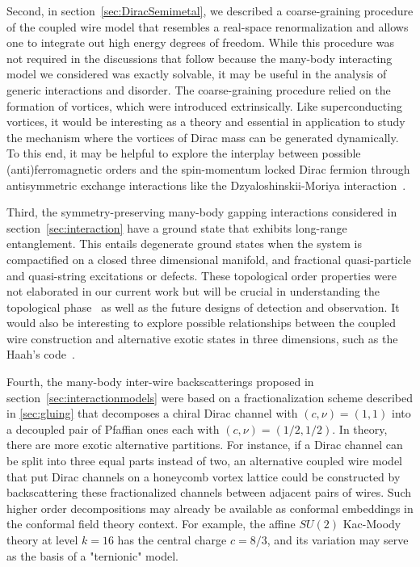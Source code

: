 Second, in section~\ref{sec:DiracSemimetal}, we described a coarse-graining procedure of the coupled wire model that resembles a real-space renormalization and allows one to integrate out high energy degrees of freedom. While this procedure was not required in the discussions that follow because the many-body interacting model we considered was exactly solvable, it may be useful in the analysis of generic interactions and disorder. The coarse-graining procedure relied on the formation of vortices, which were introduced extrinsically. Like superconducting vortices, it would be interesting as a theory and essential in application to study the mechanism where the vortices of Dirac mass can be generated dynamically. To this end, it may be helpful to explore the interplay between possible (anti)ferromagnetic orders and the spin-momentum locked Dirac fermion through antisymmetric exchange interactions like the Dzyaloshinskii-Moriya interaction~\cite{Dzyaloshinsky58,Moriya60}.

Third, the symmetry-preserving many-body gapping interactions considered in section~\ref{sec:interaction} have a ground state that exhibits long-range entanglement. This entails degenerate ground states when the system is compactified on a closed three dimensional manifold, and fractional quasi-particle and quasi-string excitations or defects. These topological order properties were not elaborated in our current work but will be crucial in understanding the topological phase~\cite{SirotaRazaTeoappearsoon} as well as the future designs of detection and observation. It would also be interesting to explore possible relationships between the coupled wire construction and alternative exotic states in three dimensions, such as the Haah's code~\cite{Haah11,Haah13}.

Fourth, the many-body inter-wire backscatterings proposed in section~\ref{sec:interactionmodels} were based on a fractionalization scheme described in \ref{sec:gluing} that decomposes a chiral Dirac channel with $(c,\nu)=(1,1)$ into a decoupled pair of Pfaffian ones each with $(c,\nu)=(1/2,1/2)$. In theory, there are more exotic alternative partitions. For instance, if a Dirac channel can be split into three equal parts instead of two, an alternative coupled wire model that put Dirac channels on a honeycomb vortex lattice could be constructed by backscattering these fractionalized channels between adjacent pairs of wires. Such higher order decompositions may already be available as conformal embeddings in the conformal field theory context. For example, the affine $SU(2)$ Kac-Moody theory at level $k=16$ has the central charge $c=8/3$, and its variation may serve as the basis of a "ternionic" model.

